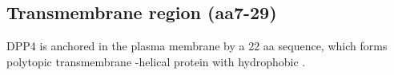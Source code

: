 \subsection{Transmembrane region (aa7-29)}

DPP4 is anchored in the plasma membrane by a 22 aa sequence, which forms polytopic transmembrane \alpha-helical protein with hydrophobic . \cite{Hong_1990}
